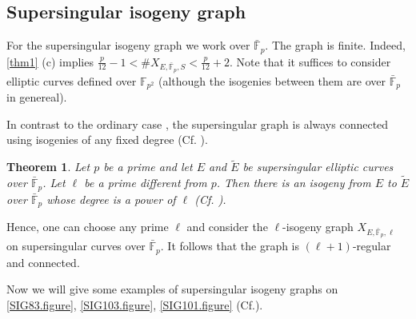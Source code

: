 \documentclass{article}
\theoremstyle{theorem}
\newtheorem{theorem}{Theorem}
\theoremstyle{definition}
\begin{document}
\subsection{Supersingular isogeny graph}

For the supersingular isogeny graph we work over $\bar{\mathbb{F}}_p$. The graph is finite. Indeed, \cref{thm1} (c) implies $\frac{p}{12} - 1 < \#X_{E, \bar{\mathbb{F}}_p, S} < \frac{p}{12} + 2$. Note that it suffices to consider elliptic curves defined over $\mathbb{F}_{p^2}$ (although the isogenies between them are over $\bar{\mathbb{F}}_p$ in genereal).

In contrast to the ordinary case , the supersingular graph is always connected using isogenies of any fixed degree (Cf. \cite[2.4]{Mestre}).

\begin{theorem}
	Let $p$ be a prime and let $E$ and $\tilde{E}$ be supersingular elliptic curves over $\bar{\mathbb{F}}_p$. Let $\ell$ be a prime different from $p$. Then there is an isogeny from $E$ to $\tilde{E}$ over $\bar{\mathbb{F}}_p$ whose degree is a power of $\ell$ (Cf. \cite[2.4]{Mestre}).
\end{theorem}

Hence, one can choose any prime $\ell$ and consider the $\ell$-isogeny graph $X_{E,\bar{\mathbb{F}}_p, {\ell}}$ on supersingular curves over $\bar{\mathbb{F}}_p$. It follows that the graph is $(\ell + 1)$-regular and connected.

Now we will give some examples of supersingular isogeny graphs on \cref{SIG83.figure}, \cref{SIG103.figure}, \cref{SIG101.figure} (Cf.\cite{Galbraith-Talk}).
\end{document}
